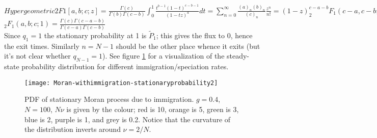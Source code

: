 $Hypergeometric2F1[a,b;c;z] = \frac{\Gamma(c)}{\Gamma(b)\Gamma(c-b)} \int_0^1 \frac{t^{b-1}(1-t)^{c-b-1}}{(1-t z)^{a}}dt = \sum_{n=0}^\infty \frac{(a)_n (b)_n}{(c)_n}\frac{z^n}{n!} = (1-z)^{c-a-b} _{2}F_1(c-a,c-b;c;z)$ \\
$_2F_1(a,b;c;1) = \frac{\Gamma(c)\Gamma(c-a-b)}{\Gamma(c-a)\Gamma(c-b)}$ \\
Since $q_1=1$ the stationary probability at 1 is $\widetilde{P}_1$; this gives the flux to 0, hence the exit times. 
Similarly $n=N-1$ should be the other place whence it exits (but it's not clear whether $q_{N-1}=1$). 
\fi
See figure \ref{stationary-fig2} for a visualization of the steady-state probability distribution for different immigration/speciation rates. 
\begin{figure}[ht]
	\centering
	\texttt{[image: Moran-withimmigration-stationaryprobability2]}
	\caption{PDF of stationary Moran process due to immigration. $g=0.4$, $N=100$, $N\nu$ is given by the colour; red is 10, orange is 5, green is 3, blue is 2, purple is 1, and grey is 0.2. Notice that the curvature of the distribution inverts around $\nu=2/N$. } \label{stationary-fig2}
\end{figure}


